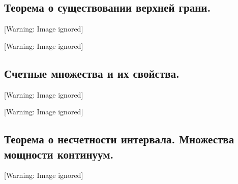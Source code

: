 \documentclass[a4paper]{article}
\begin{document}
\subsection{Теорема о существовании верхней грани.}
  [Warning: Image ignored] %
 

  [Warning: Image ignored] %
 \newline
\newline


\subsection{Счетные множества и их свойства. }
  [Warning: Image ignored] %
 

  [Warning: Image ignored] %
 

\subsection{Теорема о несчетности интервала. Множества мощности континуум.}
  [Warning: Image ignored] %
 
\end{document}
